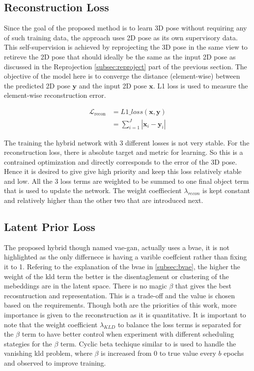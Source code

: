 \subsection{Reconstruction Loss}
Since the goal of the proposed method is to learn 3D pose without requiring any of such training data, the approach uses 2D pose as its own supervisory data. This self-supervision is achieved by reprojecting the 3D pose in the same view to retireve the 2D pose that should ideally be the same as the input 2D pose as discussed in the Reprojection \ref{subsec:reproject} part of the previous section. The objective of the model here is to converge the distance (element-wise) between the predicted 2D pose $\textbf{y}$ and the input 2D pose $\textbf{x}$. L1 loss is used to measure the element-wise reconstruction error.

\begin{equation} \label{eqn:loss_recon}
    \begin{split}
        \mathcal{L}_{\text {recon}}  & = L1\_loss(\textbf{x}, \textbf{y}) \\
        & = \sum_{i=1}^J |\textbf{x}_i - \textbf{y}_i|
    \end{split}
\end{equation}

The training the hybrid network with 3 different losses is not very stable. For the reconstruction loss, there is absolute target and metric for learning. So this is a contrained optimization and directly corresponds to the error of the 3D pose. Hence it is desired to give give high priority and keep this loss relatively stable and low. All the 3 loss terms are weighted to be summed to one final object term that is used to update the network. The weight coeffiecient $\lambda_{recon}$ is kept constant and relatively higher than the other two that are introduced next.

\subsection{Latent Prior Loss}

The proposed hybrid though named \ac{vae}-\ac{gan}, actually uses a \ac{bvae}, it is not highlighted as the only differnece is having a varible coeffcient rather than fixing it to 1. Refering to the explanation of the \ac{bvae} in \ref{subsec:bvae}, the higher the weight of the \ac{kld} term the better is the disentaglement or clustering of the mebeddings are in the latent space. There is no magic $\beta$ that gives the best recosntruction and representation. This is a trade-off and the value is chosen based on the requirements. Though both are the priorities of this work, more importance is given to the reconstruction as it is quantitative. It is important to note that the weight coefficient $\lambda_{KLD}$ to balance the loss terms is separated for the $\beta$ term to have better control when experiment with different scheduling stategies for the $\beta$ term. Cyclic beta techique similar to \cite{cyclicbeta} is used to handle the vanishing \ac{kld} problem, where $\beta$ is increased from 0 to true value every $b$ epochs and observed to improve training.


